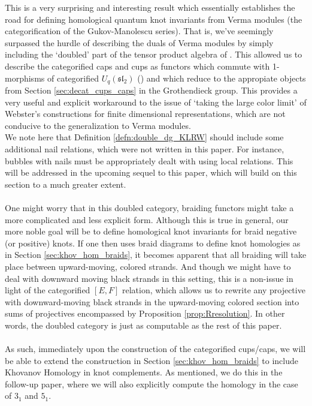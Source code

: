 \documentclass{article}
\begin{document}
This is a very surprising and interesting result which essentially establishes the road for defining homological quantum knot invariants from Verma modules (the categorification of the Gukov-Manolescu series). That is, we've seemingly surpassed the hurdle of describing the duals of Verma modules by simply including the `doubled' part of the tensor product algebra of \cite{Web}. This allowed us to describe the categorified caps and cups as functors which commute with 1-morphisms of categorified $U_q(\mathfrak{sl}_2)$ (\cite{Lau}) and which reduce to the appropiate objects from Section \ref{sec:decat_cups_caps} in the Grothendieck group. This provides a very useful and explicit workaround to the issue of `taking the large color limit' of Webster's constructions for finite dimensional representations, which are not conducive to the generalization to Verma modules.  \\

We note here that Definition \ref{defn:double_dg_KLRW} should include some additional nail relations, which were not written in this paper. For instance, bubbles with nails must be appropriately dealt with using local relations. This will be addressed in the upcoming sequel to this paper, which will build on this section to a much greater extent. \\ \\
One might worry that in this doubled category, braiding functors might take a more complicated and less explicit form. Although this is true in general, our more noble goal will be to define homological knot invariants for braid negative (or positive) knots. If one then uses braid diagrams to define knot homologies as in Section \ref{sec:khov_hom_braids}, it becomes apparent that all braiding will take place between upward-moving, colored strands. And though we might have to deal with downward moving black strands in this setting, this is a non-issue in light of the categorified $[E,F]$ relation, which allows us to rewrite any projective with downward-moving black strands in the upward-moving colored section into sums of projectives encompassed by Proposition \ref{prop:Rresolution}. In other words, the doubled category is just as computable as the rest of this paper. \\ \\
As such, immediately upon the construction of the categorified cups/caps, we will be able to extend the construction in Section \ref{sec:khov_hom_braids} to include Khovanov Homology in knot complements. As mentioned, we do this in the follow-up paper, where we will also explicitly compute the homology in the case of $3_1$ and $5_1$. 
\end{document}

